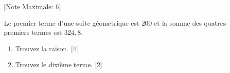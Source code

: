 \begin{question}
  \hspace*{\fill} [Note Maximale: 6]\par
  \medskip
  \noindent Le premier terme d'une suite géometrique est $200$ et la somme des quatres premiers termes est $324,8$.\par
  \begin{enumerate}[label=(\alph*)]
    \item Trouvez la raison.\hspace*{\fill} [4]
    \item Trouvez le dixième terme.\hspace*{\fill} [2]
  \end{enumerate}
\end{question}
